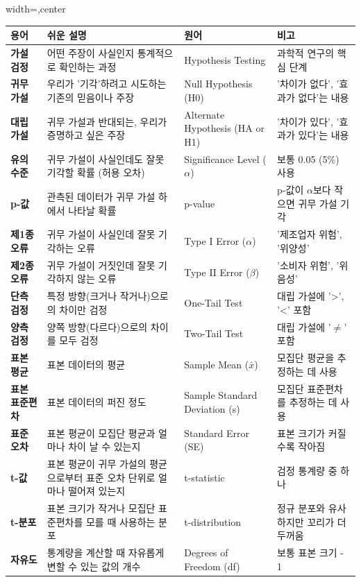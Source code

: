 \documentclass[11pt,a4paper]{article}
\begin{document}
\begin{adjustbox}{width=\textwidth,center}
\begin{tabular}{llll}
\toprule
\textbf{용어} & \textbf{쉬운 설명} & \textbf{원어} & \textbf{비고} \\
\midrule
\textbf{가설 검정} & 어떤 주장이 사실인지 통계적으로 확인하는 과정 & Hypothesis Testing & 과학적 연구의 핵심 단계 \\
\textbf{귀무 가설} & 우리가 '기각'하려고 시도하는 기존의 믿음이나 주장 & Null Hypothesis (H0) & '차이가 없다', '효과가 없다'는 내용 \\
\textbf{대립 가설} & 귀무 가설과 반대되는, 우리가 증명하고 싶은 주장 & Alternate Hypothesis (HA or H1) & '차이가 있다', '효과가 있다'는 내용 \\
\textbf{유의 수준} & 귀무 가설이 사실인데도 잘못 기각할 확률 (허용 오차) & Significance Level ($\alpha$) & 보통 0.05 (5\%) 사용 \\
\textbf{p-값} & 관측된 데이터가 귀무 가설 하에서 나타날 확률 & p-value & p-값이 $\alpha$보다 작으면 귀무 가설 기각 \\
\textbf{제1종 오류} & 귀무 가설이 사실인데 잘못 기각하는 오류 & Type I Error ($\alpha$) & '제조업자 위험', '위양성' \\
\textbf{제2종 오류} & 귀무 가설이 거짓인데 잘못 기각하지 않는 오류 & Type II Error ($\beta$) & '소비자 위험', '위음성' \\
\textbf{단측 검정} & 특정 방향(크거나 작거나)으로의 차이만 검정 & One-Tail Test & 대립 가설에 '>', '<' 포함 \\
\textbf{양측 검정} & 양쪽 방향(다르다)으로의 차이를 모두 검정 & Two-Tail Test & 대립 가설에 '$\ne$' 포함 \\
\textbf{표본 평균} & 표본 데이터의 평균 & Sample Mean ($\bar{x}$) & 모집단 평균을 추정하는 데 사용 \\
\textbf{표본 표준편차} & 표본 데이터의 퍼진 정도 & Sample Standard Deviation (s) & 모집단 표준편차를 추정하는 데 사용 \\
\textbf{표준 오차} & 표본 평균이 모집단 평균과 얼마나 차이 날 수 있는지 & Standard Error (SE) & 표본 크기가 커질수록 작아짐 \\
\textbf{t-값} & 표본 평균이 귀무 가설의 평균으로부터 표준 오차 단위로 얼마나 떨어져 있는지 & t-statistic & 검정 통계량 중 하나 \\
\textbf{t-분포} & 표본 크기가 작거나 모집단 표준편차를 모를 때 사용하는 분포 & t-distribution & 정규 분포와 유사하지만 꼬리가 더 두꺼움 \\
\textbf{자유도} & 통계량을 계산할 때 자유롭게 변할 수 있는 값의 개수 & Degrees of Freedom (df) & 보통 표본 크기 - 1 \\
\bottomrule
\end{tabular}
\end{adjustbox}
\label{tab:glossary}
\end{document}
